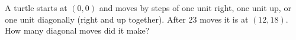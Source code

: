 A turtle starts at $(0,0)$ and moves by steps of one unit right, one unit up, or one unit diagonally (right and up together). After $23$ moves it is at $(12,18)$. How many diagonal moves did it make?
